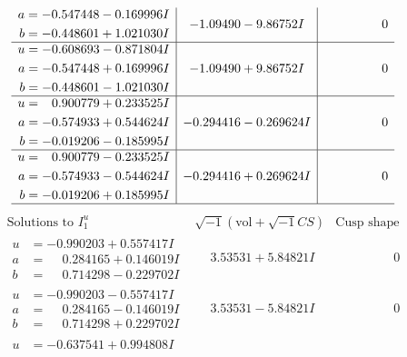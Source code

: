 \documentclass[1p]{elsarticle_modified}
\theoremstyle{definition}
\newcommand{\I}{\sqrt{-1}}
\begin{document}
$$\begin{array}{c|c|c}
\begin{aligned}
a &= -0.547448 - 0.169996 I \\
b &= -0.448601 + 1.021030 I\end{aligned}
 & -1.09490 - 9.86752 I & \phantom{-0.000000 } 0 \\ \hline\begin{aligned}
u &= -0.608693 - 0.871804 I \\
a &= -0.547448 + 0.169996 I \\
b &= -0.448601 - 1.021030 I\end{aligned}
 & -1.09490 + 9.86752 I & \phantom{-0.000000 } 0 \\ \hline\begin{aligned}
u &= \phantom{-}0.900779 + 0.233525 I \\
a &= -0.574933 + 0.544624 I \\
b &= -0.019206 - 0.185995 I\end{aligned}
 & -0.294416 - 0.269624 I & \phantom{-0.000000 } 0 \\ \hline\begin{aligned}
u &= \phantom{-}0.900779 - 0.233525 I \\
a &= -0.574933 - 0.544624 I \\
b &= -0.019206 + 0.185995 I\end{aligned}
 & -0.294416 + 0.269624 I & \phantom{-0.000000 } 0\\
 \hline 
 \end{array}$$\newpage$$\begin{array}{c|c|c}  
\text{Solutions to }I^u_{1}& \I (\text{vol} + \sqrt{-1}CS) & \text{Cusp shape}\\
 \hline 
\begin{aligned}
u &= -0.990203 + 0.557417 I \\
a &= \phantom{-}0.284165 + 0.146019 I \\
b &= \phantom{-}0.714298 - 0.229702 I\end{aligned}
 & \phantom{-}3.53531 + 5.84821 I & \phantom{-0.000000 } 0 \\ \hline\begin{aligned}
u &= -0.990203 - 0.557417 I \\
a &= \phantom{-}0.284165 - 0.146019 I \\
b &= \phantom{-}0.714298 + 0.229702 I\end{aligned}
 & \phantom{-}3.53531 - 5.84821 I & \phantom{-0.000000 } 0 \\ \hline\begin{aligned}
u &= -0.637541 + 0.994808 I \\

\end{aligned}
\end{array}$$
\end{document}
